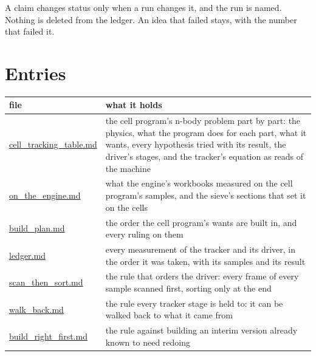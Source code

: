 A claim changes status only when a run changes it, and the run is named. Nothing is deleted from the ledger. An idea that failed stays, with the number that failed it.

\section{\texorpdfstring{Entries}{Entries}}

{\small
\setlength{\tabcolsep}{6pt}
\begin{longtable}{>{\RaggedRight\arraybackslash}p{}>{\RaggedRight\arraybackslash}p{}}
\toprule
file & what it holds \\
\midrule
\endhead
\hyperref[chap:cell-tracking-table]{cell\_\allowbreak{}tracking\_\allowbreak{}table.md} & the cell program's n-body problem part by part: the physics, what the program does for each part, what it wants, every hypothesis tried with its result, the driver's stages, and the tracker's equation as reads of the machine \\
\hyperref[chap:on-the-engine]{on\_\allowbreak{}the\_\allowbreak{}engine.md} & what the engine's workbooks measured on the cell program's samples, and the sieve's sections that set it on the cells \\
\hyperref[chap:build-plan]{build\_\allowbreak{}plan.md} & the order the cell program's wants are built in, and every ruling on them \\
\hyperref[chap:ledger]{ledger.md} & every measurement of the tracker and its driver, in the order it was taken, with its samples and its result \\
\hyperref[chap:scan-then-sort]{scan\_\allowbreak{}then\_\allowbreak{}sort.md} & the rule that orders the driver: every frame of every sample scanned first, sorting only at the end \\
\hyperref[chap:walk-back]{walk\_\allowbreak{}back.md} & the rule every tracker stage is held to: it can be walked back to what it came from \\
\hyperref[chap:build-right-first]{build\_\allowbreak{}right\_\allowbreak{}first.md} & the rule against building an interim version already known to need redoing \\
\bottomrule
\end{longtable}
}
